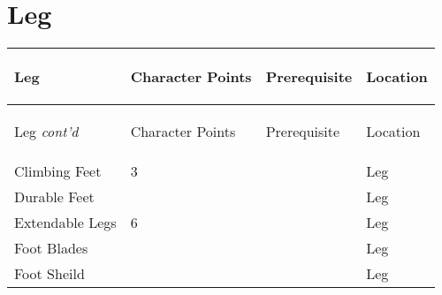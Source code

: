 \documentclass[twoside]{book}
\begin{document}
    

\section{Leg}
    
\begin{longtable}{p{1.25in}p{2em}ll} 
  Leg
  &
  \begin{turn}{70}{Character Points}\end{turn}
          
  &
  \begin{turn}{70}{Prerequisite}\end{turn}
          
  &
  \begin{turn}{70}{Location}\end{turn}
          
  \\
  \hline
  \hline
  \endfirsthead
  Leg \textit{cont'd}
        
  &
  \begin{turn}{70}{Character Points}\end{turn}
          
  &
  \begin{turn}{70}{Prerequisite}\end{turn}
          
  &
  \begin{turn}{70}{Location}\end{turn}
          
  \\
  \hline
  \endhead
      
  \raggedright
           Climbing Feet 
  &
   3 
  &
  
  &
   Leg 
  \tabularnewline
      
  \raggedright
           Durable Feet 
  &
  
  &
  
  &
   Leg 
  \tabularnewline
      
  \raggedright
           Extendable Legs 
  &
   6 
  &
  
  &
   Leg 
  \tabularnewline
      
  \raggedright
           Foot Blades 
  &
  
  &
  
  &
   Leg 
  \tabularnewline
      
  \raggedright
           Foot Sheild 
  &
  
  &
  
  &
   Leg 
  \tabularnewline
      

\end{longtable}
\end{document}
